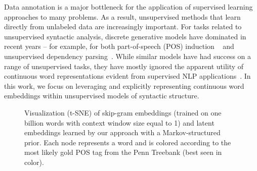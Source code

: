 \documentclass[11pt,a4paper]{article}
\begin{document}
Data annotation is a major bottleneck for the application of supervised learning approaches to many problems. As a result, unsupervised methods that learn directly from unlabeled data are increasingly important. For tasks related to unsupervised syntactic analysis, discrete generative models have dominated in recent years -- for example,
for both part-of-speech (POS) induction ~\citep{blunsom2011hierarchical, stratos2016unsupervised} and unsupervised dependency parsing~\citep{klein2004corpus, cohen2009shared, pate2016grammar}. While similar models have had success on a range of unsupervised tasks, they have mostly ignored the apparent utility of continuous word representations evident from supervised NLP applications~\citep{he2017deep, peters2018deep}. In this work, we focus on leveraging and explicitly representing continuous word embeddings within unsupervised models of syntactic structure.
\begin{figure}[!t]
\centering
\vspace{-2mm}
\caption{Visualization (t-SNE) of skip-gram embeddings (trained on one billion words with context window size equal to 1) and latent embeddings learned by our approach with a Markov-structured prior. Each node represents a word and is colored according to the most likely gold POS tag from the Penn Treebank (best seen in color). }
\label{fig:vi-pos}
\vspace{-5mm}
\end{figure}
\end{document}
